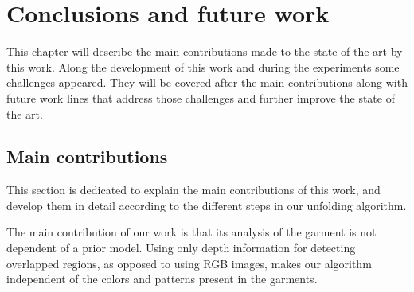 \chapter{Conclusions and future work}
\label{conclusions_and_future_work}

This chapter will describe the main contributions made to the state of the art by this work. Along the development of this work and during the experiments some challenges appeared. They will be covered after the main contributions along with future work lines that address those challenges and  further improve the state of the art.


\section {Main contributions}
\label{conclusions:contributions}

This section is dedicated to explain the main contributions of this work, and develop them in detail according to the different steps in our unfolding algorithm.

The main contribution of our work is that its analysis of the garment is not dependent of a prior model. Using only depth information for detecting overlapped regions, as opposed to using RGB images, makes our algorithm independent of the colors and patterns present in the garments. 



